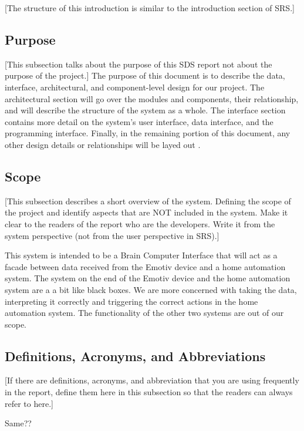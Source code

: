 \documentclass{article}
\begin{document}
[The structure of this introduction is similar to the introduction section of SRS.]

\subsection{Purpose}

[This subsection talks about the purpose of this SDS report not about the purpose of the project.]
The purpose of this document is to describe the data, interface, architectural, and component-level design for our project. The architectural section will go over the modules and components, their relationship, and will describe the structure of the system as a whole. The interface section contains more detail on the system's user interface, data interface,  and the programming interface. Finally, in the remaining portion of this document, any other design details or relationships will be layed out .

\subsection{Scope}

[This subsection describes a short overview of the system.  Defining the scope of the project and identify aspects that are NOT included in the system.  Make it clear to the readers of the report who are the developers.  Write it from the system perspective (not from the user perspective in SRS).]

This system is intended to be a Brain Computer Interface that will act as a facade between data received from the Emotiv device and a home automation system. The system on the end of the Emotiv device and the home automation system are a a bit like black boxes. We are more concerned with taking the data, interpreting it correctly and triggering the correct actions in the home automation system. The functionality of the other two systems are out of our scope. 

\subsection{Definitions, Acronyms, and Abbreviations}

[If there are definitions, acronyms, and abbreviation that you are using frequently in the report, define them here in this subsection so that the readers can always refer to here.]

Same??
\end{document}
